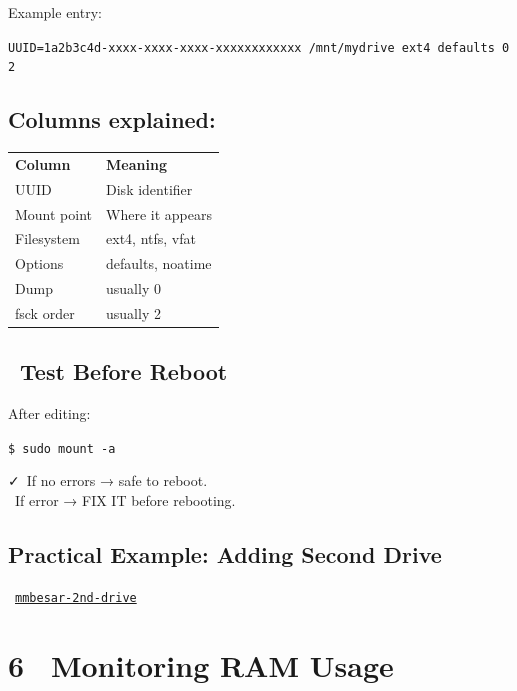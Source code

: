 \documentclass[12pt]{article}
\newcommand{\ramicon}{\faMicrochip}        %
\newcommand{\warningicon}{\faExclamationTriangle}
\newcommand{\arrowicon}{\faArrowRight}
\newcommand{\checkicon}{\faCheck}
\begin{document}
Example entry:

\begin{highlightbox}
\texttt{UUID=1a2b3c4d-xxxx-xxxx-xxxx-xxxxxxxxxxxx  /mnt/mydrive  ext4  defaults  0  2}
\end{highlightbox}

\subsection*{Columns explained:}

\begin{infobox}
\begin{tabular}{ll}
\textbf{Column} & \textbf{Meaning} \\
UUID & Disk identifier \\
Mount point & Where it appears \\
Filesystem & ext4, ntfs, vfat \\
Options & defaults, noatime \\
Dump & usually 0 \\
fsck order & usually 2 \\
\end{tabular}
\end{infobox}

\subsection*{\faFlask\ Test Before Reboot}

After editing:

\begin{highlightbox}
\texttt{\$ sudo mount -a}
\end{highlightbox}

\begin{infobox}
\checkicon\ If no errors → safe to reboot.\\
\warningicon\ If error → FIX IT before rebooting.
\end{infobox}

\subsection*{Practical Example: Adding Second Drive}

\begin{infobox}
\arrowicon\ \href{https://mmbesar.github.io/Tutorials/2nd-drive/}{\texttt{mmbesar-2nd-drive}}
\end{infobox}

\section*{6 \ramicon\ Monitoring RAM Usage}
\end{document}

